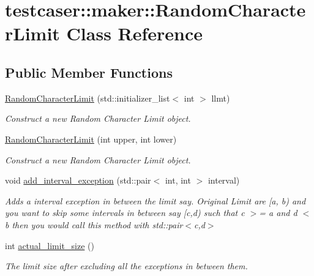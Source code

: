 \hypertarget{classtestcaser_1_1maker_1_1RandomCharacterLimit}{}\section{testcaser\+:\+:maker\+:\+:Random\+Character\+Limit Class Reference}
\label{classtestcaser_1_1maker_1_1RandomCharacterLimit}
\subsection*{Public Member Functions}
\begin{DoxyCompactItemize}
\item 
\mbox{\hyperlink{classtestcaser_1_1maker_1_1RandomCharacterLimit_a2ebd894bf7f536219bf7a917ed036c55}{Random\+Character\+Limit}} (std\+::initializer\+\_\+list$<$ int $>$ llmt)
\begin{DoxyCompactList}\small\item\em Construct a new Random Character Limit object. \end{DoxyCompactList}\item 
\mbox{\hyperlink{classtestcaser_1_1maker_1_1RandomCharacterLimit_a7a85c6420ec09f97e648f516a9bb68fd}{Random\+Character\+Limit}} (int upper, int lower)
\begin{DoxyCompactList}\small\item\em Construct a new Random Character Limit object. \end{DoxyCompactList}\item 
void \mbox{\hyperlink{classtestcaser_1_1maker_1_1RandomCharacterLimit_a9fac35205a15685a2ce671f9f38279ab}{add\+\_\+interval\+\_\+exception}} (std\+::pair$<$ int, int $>$ interval)
\begin{DoxyCompactList}\small\item\em Adds a interval exception in between the limit say. Original Limit are \mbox{[}a, b) and you want to skip some intervals in between say \mbox{[}c,d) such that c $>$= a and d $<$ b then you would call this method with std\+::pair$<$c,d$>$ \end{DoxyCompactList}\item 
int \mbox{\hyperlink{classtestcaser_1_1maker_1_1RandomCharacterLimit_a912c757f9c26f6ba3e3ec18db3c904c5}{actual\+\_\+limit\+\_\+size}} ()
\begin{DoxyCompactList}\small\item\em The limit size after excluding all the exceptions in between them. \end{DoxyCompactList}\item 

\end{DoxyCompactItemize}
